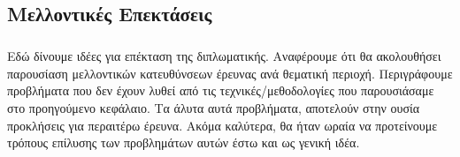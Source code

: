 \documentclass[12pt]{article}
\begin{document}
\subsection{Μελλοντικές Επεκτάσεις}
\subparagraph{}
Εδώ δίνουμε ιδέες για επέκταση της διπλωματικής. Αναφέρουμε ότι θα ακολουθήσει παρουσίαση μελλοντικών κατευθύνσεων έρευνας ανά θεματική περιοχή. Περιγράφουμε προβλήματα που δεν έχουν λυθεί από τις τεχνικές/μεθοδολογίες που παρουσιάσαμε στο προηγούμενο κεφάλαιο. Τα άλυτα αυτά προβλήματα, αποτελούν στην ουσία προκλήσεις για περαιτέρω έρευνα. Ακόμα καλύτερα, θα ήταν ωραία να προτείνουμε τρόπους επίλυσης των προβλημάτων αυτών έστω και ως γενική ιδέα.

\clearpage
{}

 
 
\end{document}
